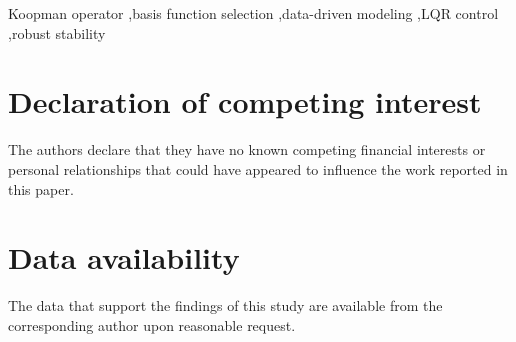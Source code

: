 \documentclass[a4paper,fleqn]{cas-dc}
\begin{document}
\begin{keywords}
Koopman operator \sep basis function selection \sep data-driven modeling \sep LQR control \sep robust stability
\end{keywords}

\maketitle



\printcredits

\section*{Declaration of competing interest}
The authors declare that they have no known competing financial interests or personal relationships that could have appeared to influence the work reported in this paper.

\section*{Data availability}
The data that support the findings of this study are available from the corresponding author upon reasonable request.



\end{document}
